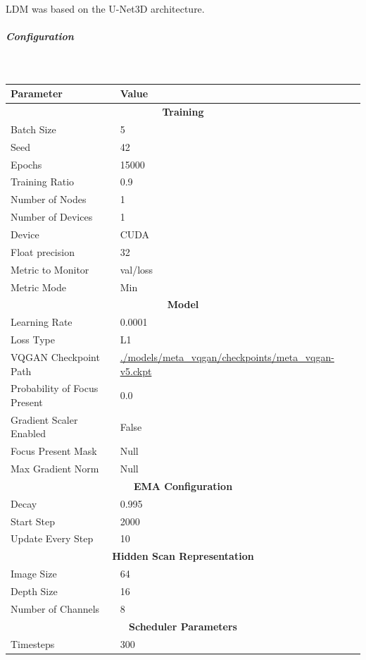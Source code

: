 \indent LDM was based on the U-Net3D architecture.
\subparagraph{Configuration}\mbox{}\\

\begin{table}[H]
\centering
\begin{tabular}{|l|l|}
\hline
\textbf{Parameter} & \textbf{Value} \\
\hline
\multicolumn{2}{|c|}{\textbf{Training}} \\
\hline
Batch Size & 5 \\
\hline
Seed & 42 \\
\hline
Epochs & 15000 \\
\hline
Training Ratio & 0.9 \\
\hline
Number of Nodes & 1 \\
\hline
Number of Devices & 1 \\
\hline
Device & CUDA \\
\hline
Float precision & 32 \\
\hline
Metric to Monitor & val/loss \\
\hline
Metric Mode & Min \\
\hline
\multicolumn{2}{|c|}{\textbf{Model}} \\
\hline
Learning Rate & 0.0001 \\
\hline
Loss Type & L1 \\
\hline
VQGAN Checkpoint Path & \url{./models/meta_vqgan/checkpoints/meta_vqgan-v5.ckpt} \\
\hline
Probability of Focus Present & 0.0 \\
\hline
Gradient Scaler Enabled & False \\
\hline
Focus Present Mask & Null \\
\hline
Max Gradient Norm & Null \\
\hline
\multicolumn{2}{|c|}{\textbf{EMA Configuration}} \\
\hline
Decay & 0.995 \\
\hline
Start Step & 2000 \\
\hline
Update Every Step & 10 \\
\hline
\multicolumn{2}{|c|}{\textbf{Hidden Scan Representation}} \\
\hline
Image Size & 64 \\
\hline
Depth Size & 16 \\
\hline
Number of Channels & 8 \\
\hline
\multicolumn{2}{|c|}{\textbf{Scheduler Parameters}} \\
\hline
Timesteps & 300 \\

\end{tabular}
\end{table}
